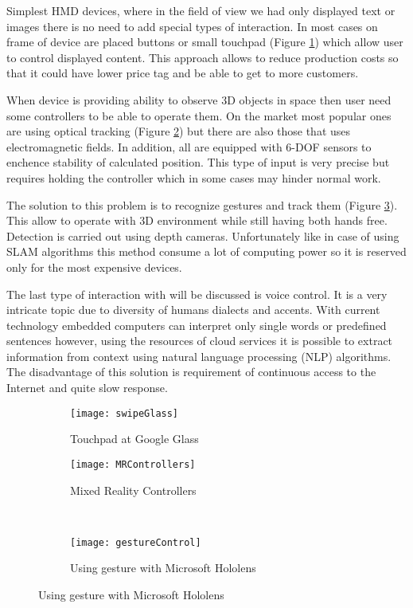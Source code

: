 \documentclass[printmode,en]{mgr}
\begin{document}
Simplest HMD devices, where in the field of view we had only displayed text or images there is no need to add special types of interaction. In most cases on frame of device are placed buttons or small touchpad (Figure \ref{fig:swipeGlass}) which allow user to control displayed content. This approach allows to reduce production costs so that it could have lower price tag and be able to get to more customers.

When device is providing ability to observe 3D objects in space then user need some controllers to be able to operate them. On the market most popular ones are using optical tracking (Figure \ref{fig:MRControllers}) but there are also those that uses electromagnetic fields. In addition, all are equipped with 6-DOF sensors to enchence stability of calculated position. This type of input is very precise but requires holding the controller which in some cases may hinder normal work.

The solution to this problem is to recognize gestures and track them (Figure \ref{fig:gestureControl}). This allow to operate with 3D environment while still having both hands free. Detection is carried out using depth cameras. Unfortunately like in case of using SLAM algorithms this method consume a lot of computing power so it is reserved only for the most expensive devices.

The last type of interaction with will be discussed is voice control. It is a very intricate topic due to diversity of humans dialects and accents. With current technology embedded computers can interpret only single words or predefined sentences however, using the resources of cloud services it is possible to extract information from context using natural language processing (NLP) algorithms. The disadvantage of this solution is requirement of continuous access to the Internet and quite slow response.

\begin{figure}[!ht]
\centering
\begin{subfigure}{.5\textwidth}
  \centering
  \texttt{[image: swipeGlass]}
  \caption{Touchpad at Google Glass \cite{swipeGlass}}
  \label{fig:swipeGlass}
\end{subfigure}%
\begin{subfigure}{.5\textwidth}
  \centering
  \texttt{[image: MRControllers]}
  \caption{Mixed Reality Controllers \cite{MRControllers}}
  \label{fig:MRControllers}
\end{subfigure}\\
\begin{subfigure}{.5\textwidth}
  \centering
  \texttt{[image: gestureControl]}
  \caption{Using gesture with Microsoft Hololens \cite{gestureControl}}
  \label{fig:gestureControl}
\end{subfigure}%
\label{fig:ARInteraction}
\end{figure}
\end{document}
